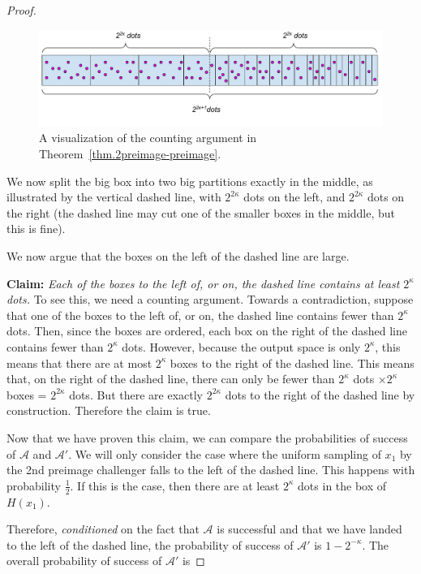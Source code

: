 \begin{proof}
  \begin{figure}[H]
    \centering
    \includegraphics[width=\columnwidth,keepaspectratio]{figures/2preimage-preimage.pdf}
    \caption{A visualization of the counting argument in Theorem~\ref{thm.2preimage-preimage}.}
    \label{fig.2preimage-preimage}
  \end{figure}

  We now split the big box into two big partitions exactly in the middle, as illustrated by the vertical dashed line, with $2^{2\kappa}$ dots on the left, and $2^{2\kappa}$ dots on the right (the dashed line may cut one of the smaller boxes in the middle, but this is fine).

  We now argue that the boxes on the left of the dashed line are large.

  \textbf{Claim: } \emph{Each of the boxes to the left of, or on, the dashed line contains at least $2^\kappa$ dots.} To see this, we need a counting argument. Towards a contradiction, suppose that one of the boxes to the left of, or on, the dashed line contains fewer than $2^\kappa$ dots. Then, since the boxes are ordered, each box on the right of the dashed line contains fewer than $2^\kappa$ dots. However, because the output space is only $2^\kappa$, this means that there are at most $2^\kappa$ boxes to the right of the dashed line. This means that, on the right of the dashed line, there can only be fewer than $2^\kappa$ dots $\times 2^\kappa$ boxes = $2^{2\kappa}$ dots. But there are exactly $2^{2\kappa}$ dots to the right of the dashed line by construction. Therefore the claim is true.

  Now that we have proven this claim, we can compare the probabilities of success of $\mathcal{A}$ and $\mathcal{A}'$. We will only consider the case where the uniform sampling of $x_1$ by the 2nd preimage challenger falls to the left of the dashed line. This happens with probability $\frac{1}{2}$. If this is the case, then there are at least $2^{\kappa}$ dots in the box of $H(x_1)$.

  Therefore, \emph{conditioned} on the fact that $\mathcal{A}$ is successful and that we have landed to the left of the dashed line, the probability of success of $\mathcal{A}'$ is $1 - 2^{-\kappa}$. The overall probability of success of $\mathcal{A}'$ is


\end{proof}
